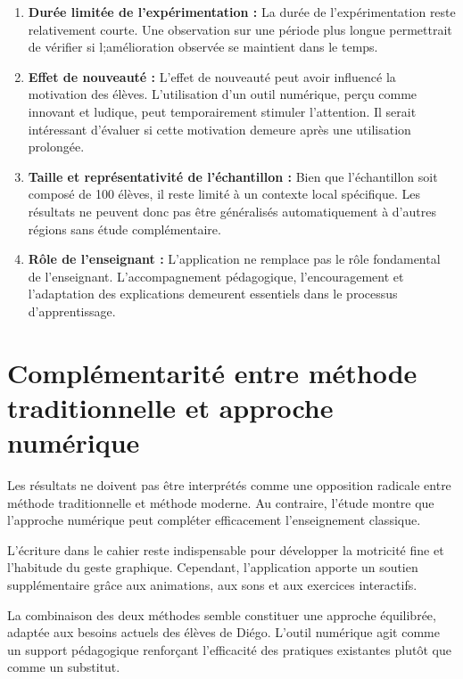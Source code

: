 \documentclass[a4paper,oneside,12pt]{book}
\begin{document}
\begin{enumerate}
	\item \textbf{Durée limitée de l'expérimentation :} La durée de l'expérimentation reste relativement courte. Une observation sur une période plus longue permettrait de vérifier si l;amélioration observée se maintient dans le temps.
	
	\item \textbf{Effet de nouveauté :} L'effet de nouveauté peut avoir influencé la motivation des élèves. L'utilisation d'un outil numérique, perçu comme innovant et ludique, peut temporairement stimuler l'attention. Il serait intéressant d'évaluer si cette motivation demeure après une utilisation prolongée.
	
	\item \textbf{Taille et représentativité de l'échantillon :} Bien que l'échantillon soit composé de 100 élèves, il reste limité à un contexte local spécifique. Les résultats ne peuvent donc pas être généralisés automatiquement à d'autres régions sans étude complémentaire.
	
	\item \textbf{Rôle de l'enseignant :} L'application ne remplace pas le rôle fondamental de l'enseignant. L'accompagnement pédagogique, l'encouragement et l'adaptation des explications demeurent essentiels dans le processus d'apprentissage.
\end{enumerate}

\section{ Complémentarité entre méthode traditionnelle et approche numérique}


Les résultats ne doivent pas être interprétés comme une opposition radicale entre méthode traditionnelle et méthode moderne. Au contraire, l'étude montre que l'approche numérique peut compléter efficacement l'enseignement classique.

L'écriture dans le cahier reste indispensable pour développer la motricité fine et l'habitude du geste graphique. Cependant, l'application apporte un soutien supplémentaire grâce aux animations, aux sons et aux exercices interactifs.

La combinaison des deux méthodes semble constituer une approche équilibrée, adaptée aux besoins actuels des élèves de Diégo. L'outil numérique agit comme un support pédagogique renforçant l'efficacité des pratiques existantes plutôt que comme un substitut.
\end{document}
